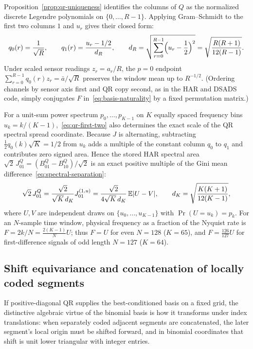 Proposition~\ref{prop:qr-uniqueness} identifies the columns of \(Q\) as the
normalized discrete Legendre polynomials on \(\{0, \ldots, R-1\}\). Applying
Gram--Schmidt to the first two columns \(1\) and \(u_r\) gives their closed form:
\begin{equation}\label{eq:qr-first-two}
 q_0(r) = \frac{1}{\sqrt R}, \qquad
 q_1(r) = \frac{u_r - 1/2}{d_R}, \qquad
 d_R = \sqrt{\sum_{r=0}^{R-1} \Bigl(u_r - \frac{1}{2}\Bigr)^2}
     = \sqrt{\frac{R(R+1)}{12(R-1)}}.
\end{equation}
Under scaled sensor readings \(z_r = a_r / R\), the \(p=0\) endpoint
\(\sum_{r=0}^{R-1} q_0(r) z_r = \bar a / \sqrt R\) preserves the window mean up
to \(R^{-1/2}\). (Ordering channels by sensor axis first and QR copy second, as
in the HAR and DSADS code, simply conjugates \(F\) in~\eqref{eq:basis-naturality}
by a fixed permutation matrix.)

For a unit-sum power spectrum \(p_0, \ldots, p_{K-1}\) on \(K\) equally spaced
frequency bins \(u_k = k/(K-1)\),~\eqref{eq:qr-first-two} also determines the
exact scale of the QR spectral spread coordinate. Because \(J\) is alternating,
subtracting \(\tfrac12 q_0(k)\sqrt K = 1/2\) from \(u_k\) adds a multiple of the
constant column \(q_0\) to \(q_1\) and contributes zero signed area. Hence the
stored HAR spectral area \(\sqrt 2\,J^Q_{01} = (B^Q_{01} - B^Q_{10})/\sqrt 2\) is
an exact positive multiple of the Gini mean difference~\eqref{eq:spectral-separation}:
\begin{equation}\label{eq:spectral-qr-scale}
 \sqrt 2\,J^Q_{01}
   = \frac{\sqrt 2}{\sqrt K\,d_K} J^{(1,u)}_{01}
   = \frac{\sqrt 2}{4\sqrt K\,d_K}\,\mathbb{E}|U - V|,
 \qquad d_K = \sqrt{\frac{K(K+1)}{12(K-1)}},
\end{equation}
where \(U, V\) are independent draws on \(\{u_0, \ldots, u_{K-1}\}\) with
\(\Pr(U = u_k) = p_k\). For an \(N\)-sample time window, physical frequency as a
fraction of the Nyquist rate is \(F = 2k/N = \frac{2(K-1)}{N} U\); thus \(F = U\)
for even \(N = 128\) (\(K = 65\)), and \(F = \frac{126}{127} U\) for
first-difference signals of odd length \(N = 127\) (\(K = 64\)).

\subsection{Shift equivariance and concatenation of locally coded segments}
If positive-diagonal QR supplies the best-conditioned basis on a fixed grid, the
distinctive algebraic virtue of the binomial basis is how it transforms under
index translations: when separately coded adjacent segments are concatenated, the
later segment's local origin must be shifted forward, and in binomial coordinates
that shift is unit lower triangular with integer entries.

